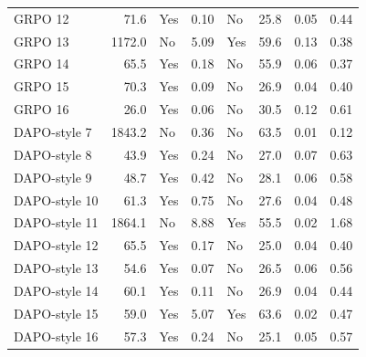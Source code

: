 \documentclass[ai,article,submit,oneauthor]{Definitions/mdpi}
\begin{document}
\begin{table}[H]
{\begin{tabular}{lrlrlrrr}
GRPO 12 & 71.6 & Yes & 0.10 & No & 25.8 & 0.05 & 0.44 \\
GRPO 13 & 1172.0 & No & 5.09 & Yes & 59.6 & 0.13 & 0.38 \\
GRPO 14 & 65.5 & Yes & 0.18 & No & 55.9 & 0.06 & 0.37 \\
GRPO 15 & 70.3 & Yes & 0.09 & No & 26.9 & 0.04 & 0.40 \\
GRPO 16 & 26.0 & Yes & 0.06 & No & 30.5 & 0.12 & 0.61 \\
\midrule
DAPO-style 7 & 1843.2 & No & 0.36 & No & 63.5 & 0.01 & 0.12 \\
DAPO-style 8 & 43.9 & Yes & 0.24 & No & 27.0 & 0.07 & 0.63 \\
DAPO-style 9 & 48.7 & Yes & 0.42 & No & 28.1 & 0.06 & 0.58 \\
DAPO-style 10 & 61.3 & Yes & 0.75 & No & 27.6 & 0.04 & 0.48 \\
DAPO-style 11 & 1864.1 & No & 8.88 & Yes & 55.5 & 0.02 & 1.68 \\
DAPO-style 12 & 65.5 & Yes & 0.17 & No & 25.0 & 0.04 & 0.40 \\
DAPO-style 13 & 54.6 & Yes & 0.07 & No & 26.5 & 0.06 & 0.56 \\
DAPO-style 14 & 60.1 & Yes & 0.11 & No & 26.9 & 0.04 & 0.44 \\
DAPO-style 15 & 59.0 & Yes & 5.07 & Yes & 63.6 & 0.02 & 0.47 \\
DAPO-style 16 & 57.3 & Yes & 0.24 & No & 25.1 & 0.05 & 0.57 \\
\bottomrule
\end{tabular}}
\end{table}


\end{document}
